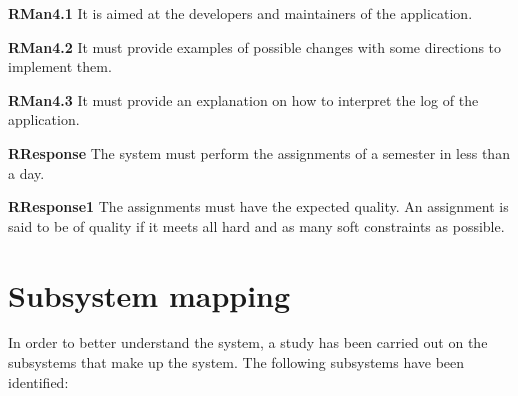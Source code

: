 \begin{description}
\begin{description}
                \begin{description}
                    \item \textbf{RMan4.1} It is aimed at the developers and maintainers of the application.
                    \item \textbf{RMan4.2} It must provide examples of possible changes with some directions to implement them. 
                    \item \textbf{RMan4.3} It must provide an explanation on how to interpret the log of the application. 
                \end{description}
        \end{description}

    \item \textbf{RResponse} The system must perform the assignments of a semester in less than a day.
        \begin{description}
            \item \textbf{RResponse1} The assignments must have the expected quality. An assignment is said to be of quality if it meets all hard and as many soft constraints as possible.
        \end{description}

\end{description}



\section{Subsystem mapping}

In order to better understand the system, a study has been carried out on the subsystems that make up the system. The following subsystems have been identified:

